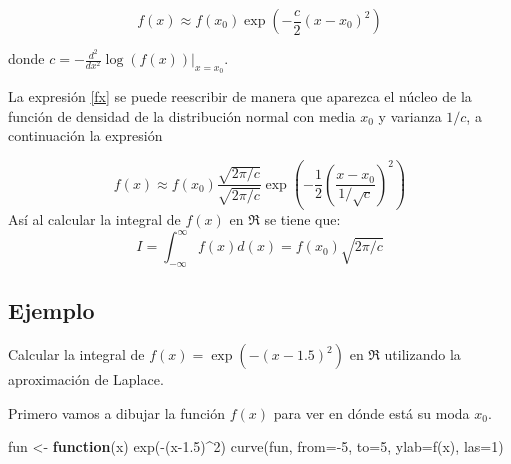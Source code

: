 \documentclass[
]{book}
\makeatletter
\newenvironment{Shaded}{\begin{snugshade}}{\end{snugshade}}
\newcommand{\AttributeTok}[1]{\textcolor[rgb]{0.77,0.63,0.00}{#1}}
\newcommand{\ControlFlowTok}[1]{\textcolor[rgb]{0.13,0.29,0.53}{\textbf{#1}}}
\newcommand{\DecValTok}[1]{\textcolor[rgb]{0.00,0.00,0.81}{#1}}
\newcommand{\FloatTok}[1]{\textcolor[rgb]{0.00,0.00,0.81}{#1}}
\newcommand{\FunctionTok}[1]{\textcolor[rgb]{0.00,0.00,0.00}{#1}}
\newcommand{\NormalTok}[1]{#1}
\newcommand{\OtherTok}[1]{\textcolor[rgb]{0.56,0.35,0.01}{#1}}
\newcommand{\SpecialCharTok}[1]{\textcolor[rgb]{0.00,0.00,0.00}{#1}}
\newcommand{\StringTok}[1]{\textcolor[rgb]{0.31,0.60,0.02}{#1}}
\newenvironment{kframe}{%
\medskip{}
\setlength{\fboxsep}{.8em}
 \def\at@end@of@kframe{}%
 \ifinner\ifhmode%
  \def\at@end@of@kframe{\end{minipage}}%
  \begin{minipage}{\columnwidth}%
 \fi\fi%
 \def\FrameCommand##1{\hskip\@totalleftmargin \hskip-\fboxsep
 \colorbox{shadecolor}{##1}\hskip-\fboxsep
     \hskip-\linewidth \hskip-\@totalleftmargin \hskip\columnwidth}%
 \MakeFramed {\advance\hsize-\width
   \@totalleftmargin\z@ \linewidth\hsize
   \@setminipage}}%
 {\par\unskip\endMakeFramed%
 \at@end@of@kframe}
\renewenvironment{Shaded}{\begin{kframe}}{\end{kframe}}
\makeatother
\begin{document}
\begin{equation} \label{fx}
f(x) \approx f(x_0)  \exp \left( -\frac{c}{2} (x-x_0)^2 \right)
\end{equation}

donde \(c=-\frac{d^2}{dx^2} \log(f(x)) \bigg|_{x=x_0}\).

La expresión \ref{fx} se puede reescribir de manera que aparezca el núcleo de la función de densidad de la distribución normal con media \(x_0\) y varianza \(1/c\), a continuación la expresión

\[
f(x) \approx f(x_0) \frac{\sqrt{2 \pi / c}}{\sqrt{2 \pi / c}}  \exp \left( -\frac{1}{2} \left( \frac{x-x_0}{1/\sqrt{c}} \right)^2 \right)
\]
Así al calcular la integral de \(f(x)\) en \(\Re\) se tiene que:
\begin{equation} \label{aprox_laplace}
I = \int_{-\infty}^{\infty} f(x) d(x) = f(x_0) \sqrt{2 \pi / c}
\end{equation}

\hypertarget{ejemplo-75}{%
\subsection*{Ejemplo}\label{ejemplo-75}}

Calcular la integral de \(f(x)=\exp \left( -(x-1.5)^2 \right)\) en \(\Re\) utilizando la aproximación de Laplace.

Primero vamos a dibujar la función \(f(x)\) para ver en dónde está su moda \(x_0\).

\begin{Shaded}
\begin{Highlighting}[]
\NormalTok{fun }\OtherTok{\textless{}{-}} \ControlFlowTok{function}\NormalTok{(x) }\FunctionTok{exp}\NormalTok{(}\SpecialCharTok{{-}}\NormalTok{(x}\FloatTok{{-}1.5}\NormalTok{)}\SpecialCharTok{\^{}}\DecValTok{2}\NormalTok{)}
\FunctionTok{curve}\NormalTok{(fun, }\AttributeTok{from=}\SpecialCharTok{{-}}\DecValTok{5}\NormalTok{, }\AttributeTok{to=}\DecValTok{5}\NormalTok{, }\AttributeTok{ylab=}\StringTok{\textquotesingle{}f(x)\textquotesingle{}}\NormalTok{, }\AttributeTok{las=}\DecValTok{1}\NormalTok{)}
\end{Highlighting}
\end{Shaded}
\end{document}

